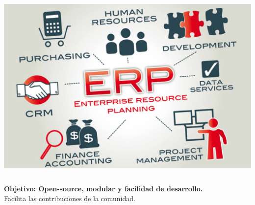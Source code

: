 {\begin{frame}{}
\begin{columns}
            \includegraphics[width=\textwidth]{./Images/erp-explicacion.jpg}
        \end{columns}
        \vspace*{2mm}
        \begin{tcolorbox}[colback=ChetwodeBlue!10,colframe=ChetwodeBlue!60]
            \centering
            {\color{TurkishRose}\textbf{Objetivo: Open-source, modular y facilidad de desarrollo.}} \\
            Facilita las contribuciones de la comunidad.
        \end{tcolorbox}

	\end{frame}
}
